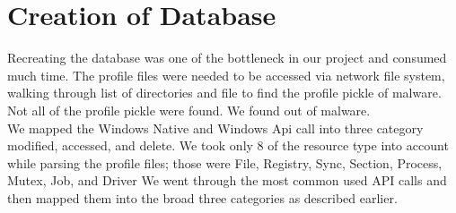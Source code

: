 \section{Creation of Database}
\label{sec:Creation of Database}
Recreating the database was one of the bottleneck in our project and consumed much time.
The profile files were needed to be accessed via network file system, walking through list of directories and file to find the profile pickle of malware.
Not all of the profile pickle were found. We found \emph{\gettotalmalwareii{}} out of \emph{\gettotalmalwarei{}} malware.\\
We mapped the Windows Native and Windows Api call into three category modified, accessed, and delete.
We took only 8 of the resource type into account while parsing the profile files; those were File, Registry, Sync, Section, Process, Mutex, Job, and Driver
We went through the most common used API calls and then mapped them into the broad three categories as described earlier.


